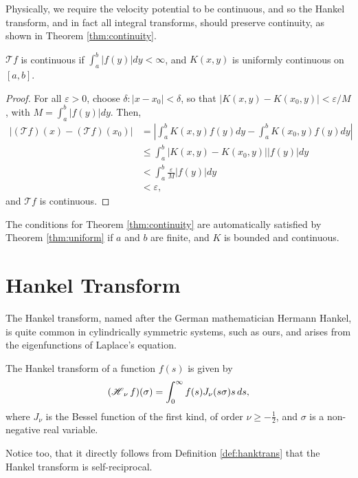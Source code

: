Physically, we require the velocity potential to be continuous, and so the Hankel transform, and in fact all integral transforms, should preserve continuity, as shown in Theorem \ref{thm:continuity}.

\begin{theorem}
\label{thm:continuity}
$\mathcal{T}f$ is continuous if $\int_a^b |f(y)| dy < \infty$, and $K(x,y)$ is uniformly continuous on $[a,b]$.
\end{theorem}
\begin{proof}
For all $\varepsilon > 0$, choose $\delta : |x - x_0| < \delta$, so that $|K(x,y) - K(x_0,y)| < \varepsilon/M$, with $M = \int_a^b |f(y)| dy$. Then,
\begin{align*}
|(\mathcal{T}f)(x) - (\mathcal{T}f)(x_0)| &= \left| \int_a^b K(x,y)f(y) dy - \int_a^b K(x_0,y)f(y) dy \right| \\
&\leq \int_a^b |K(x,y) - K(x_0,y)||f(y)| dy \\
&< \int_a^b \frac{\varepsilon}{M} |f(y)| dy \\
&< \varepsilon,
\end{align*}
and $\mathcal{T}f$ is continuous.
\end{proof}

The conditions for Theorem \ref{thm:continuity} are automatically satisfied by Theorem \ref{thm:uniform} if $a$ and $b$ are finite, and $K$ is bounded and continuous.

\section{Hankel Transform}

The Hankel transform, named after the German mathematician Hermann Hankel, is quite common in cylindrically symmetric systems, such as ours, and arises from the eigenfunctions of Laplace's equation.

\begin{definition}
\label{def:hanktrans}
The Hankel transform of a function $f(s)$ is given by
\begin{align*}
\Hank[\nu]{f}(\sigma) = \int_0^\infty f(s) J_\nu(s \sigma) s \, ds,
\end{align*}
where $J_\nu$ is the Bessel function of the first kind, of order $\nu \geq -\frac{1}{2}$, and $\sigma$ is a non-negative real variable.
\end{definition}

Notice too, that it directly follows from Definition \ref{def:hanktrans} that the Hankel transform is self-reciprocal.

